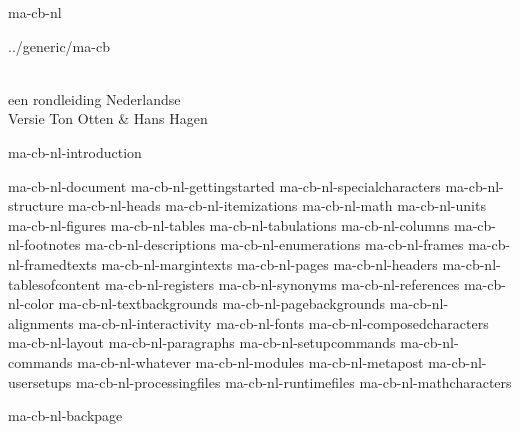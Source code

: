 
\mainlanguage[nl]

\startprodukt ma-cb-nl

\projekt ../generic/ma-cb

\TitlePage
  {\ConTeXt\\een rondleiding}
  {Nederlandse\\Versie}
  {Ton Otten \& Hans Hagen}

\Copyright

\startinleidingen


    \component ma-cb-nl-introduction

\stopinleidingen

\starthoofdteksten

    \onderdeel ma-cb-nl-document
    \onderdeel ma-cb-nl-gettingstarted
    \onderdeel ma-cb-nl-specialcharacters
    \onderdeel ma-cb-nl-structure
    \onderdeel ma-cb-nl-heads
    \onderdeel ma-cb-nl-itemizations
    \onderdeel ma-cb-nl-math
    \onderdeel ma-cb-nl-units
    \onderdeel ma-cb-nl-figures
    \onderdeel ma-cb-nl-tables
    \onderdeel ma-cb-nl-tabulations
    \onderdeel ma-cb-nl-columns
    \onderdeel ma-cb-nl-footnotes
    \onderdeel ma-cb-nl-descriptions
    \onderdeel ma-cb-nl-enumerations
    \onderdeel ma-cb-nl-frames
    \onderdeel ma-cb-nl-framedtexts
    \onderdeel ma-cb-nl-margintexts
    \onderdeel ma-cb-nl-pages
    \onderdeel ma-cb-nl-headers
    \onderdeel ma-cb-nl-tablesofcontent
    \onderdeel ma-cb-nl-registers
    \onderdeel ma-cb-nl-synonyms
    \onderdeel ma-cb-nl-references
    \onderdeel ma-cb-nl-color
    \onderdeel ma-cb-nl-textbackgrounds
    \onderdeel ma-cb-nl-pagebackgrounds
    \onderdeel ma-cb-nl-alignments
    \onderdeel ma-cb-nl-interactivity
    \onderdeel ma-cb-nl-fonts
    \onderdeel ma-cb-nl-composedcharacters
    \onderdeel ma-cb-nl-layout
    \onderdeel ma-cb-nl-paragraphs
    \onderdeel ma-cb-nl-setupcommands
    \onderdeel ma-cb-nl-commands
    \onderdeel ma-cb-nl-whatever
    \onderdeel ma-cb-nl-modules
    \onderdeel ma-cb-nl-metapost
    \onderdeel ma-cb-nl-usersetups
    \onderdeel ma-cb-nl-processingfiles
    \onderdeel ma-cb-nl-runtimefiles
    \onderdeel ma-cb-nl-mathcharacters

\stophoofdteksten

\startbijlagen


\stopbijlagen

\Colofon

\startmode[bound]

    \StartBackPage
        \component ma-cb-nl-backpage
    \StopBackPage

\stopmode

\stopprodukt
